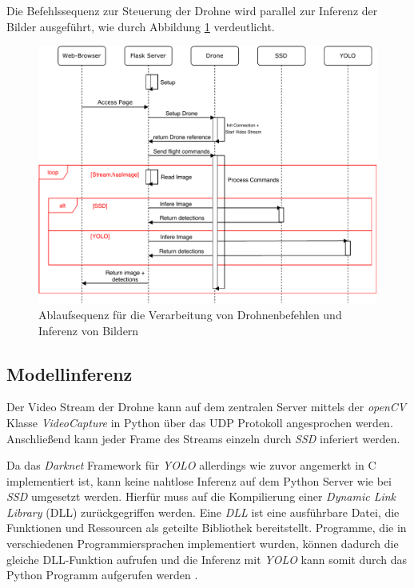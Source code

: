 Die Befehlssequenz zur Steuerung der Drohne wird parallel zur Inferenz der Bilder ausgeführt, wie durch Abbildung \ref{sequence_diagram} verdeutlicht.

\begin{figure}[H]
	\begin{center}
		\includegraphics[width=15cm]{Bilder/sequence_diagram.pdf}
		\caption[Ablaufsequenz für die Verarbeitung von Drohnenbefehlen und Inferenz von Bildern]{Ablaufsequenz für die Verarbeitung von Drohnenbefehlen und Inferenz von Bildern}
		\label{sequence_diagram}
	\end{center}
\end{figure}

\subsection*{Modellinferenz}

Der Video Stream der Drohne kann auf dem zentralen Server mittels der \textit{openCV} Klasse \textit{VideoCapture} in Python über das UDP Protokoll angesprochen werden. Anschließend kann jeder Frame des Streams einzeln durch \textit{SSD} inferiert werden.

Da das \textit{Darknet} Framework für \textit{YOLO} allerdings wie zuvor angemerkt in C implementiert ist, kann keine nahtlose Inferenz auf dem Python Server wie bei \textit{SSD} umgesetzt werden. Hierfür muss auf die Kompilierung einer \textit{Dynamic Link Library} (DLL) zurückgegriffen werden. Eine \textit{DLL} ist eine ausführbare Datei, die Funktionen und Ressourcen als geteilte Bibliothek bereitstellt. Programme, die in verschiedenen Programmiersprachen implementiert wurden, können dadurch die gleiche DLL-Funktion aufrufen und die Inferenz mit \textit{YOLO} kann somit durch das Python Programm aufgerufen werden \cite{MicrosoftCorporation.27.01.2020}.

